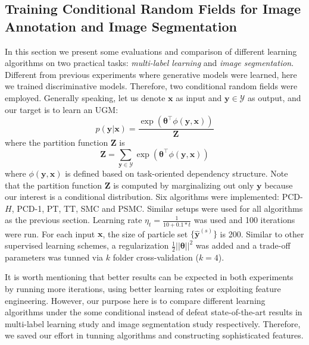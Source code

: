 \subsection {Training Conditional Random Fields for Image Annotation and Image Segmentation}
In this section we present some evaluations and comparison of different learning algorithms on two practical tasks: \emph{multi-label learning} and \emph{image 
segmentation}. Different from previous experiments where generative models were learned, here we trained discriminative models. Therefore, two 
conditional random fields were employed. Generally speaking, let us denote $\mathbf{x}$ as input and $\mathbf{y}\in \mathcal{Y}$ as output, and our target is to 
learn an UGM:  
\begin{equation}
	p(\mathbf{y}|\mathbf{x})=\frac{\exp(\boldsymbol{\theta}^\top \phi(\mathbf{y},\mathbf{x}))}{\mathbf{Z}}
\end{equation}
where the partition function $\mathbf{Z}$ is
\begin{equation}
	\mathbf{Z}=\sum_{\mathbf{y}\in\mathcal{Y}}\exp(\boldsymbol{\theta}^\top \phi(\mathbf{y},\mathbf{x}))
\end{equation}
where $\phi(\mathbf{y},\mathbf{x})$ is defined based on task-oriented dependency structure. Note that the partition function $\mathbf{Z}$ is computed by 
marginalizing out only $\mathbf{y}$ because our interest is a conditional distribution. Six algorithms 
were implemented: PCD-$H$, PCD-1, PT, TT, SMC and PSMC. Similar setups were used for all algorithms as the previous section.  
Learning rate $\eta_t=\frac{1}{10+0.1*t}$ was used and 100 iterations were run. For each input $\mathbf{x}$, 
the size of particle set $\{ \hat{\mathbf{y}}^{(s)}\}$ is 200.  Similar to other supervised learning schemes, a regularization $\frac{1}{2}||\boldsymbol{\theta}||^2$ 
was added and a trade-off parameters was tunned via $k$ folder cross-validation ($k=4$).  

It is worth mentioning that better results can be expected in both experiments by running more iterations, using better learning rates or exploiting 
feature engineering. However, our purpose here is to compare different learning algorithms under the some conditional instead of defeat state-of-the-art 
results in multi-label learning study and image segmentation study respectively. Therefore, we saved our effort in tunning algorithms and constructing 
sophisticated features. 

